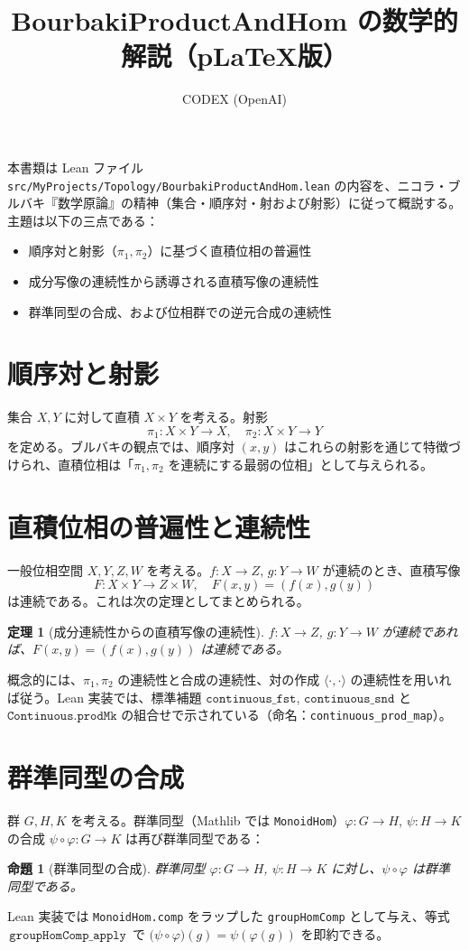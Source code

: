 \documentclass[a4paper,11pt]{jsarticle}
\title{BourbakiProductAndHom の数学的解説（p\LaTeX 版）}
\author{CODEX (OpenAI)}
\date{}
\newtheorem{theorem}{定理}
\newtheorem{proposition}{命題}
\theoremstyle{definition}
\begin{document}
\maketitle

本書類は Lean ファイル \texttt{src/MyProjects/Topology/BourbakiProductAndHom.lean} の内容を、ニコラ・ブルバキ『数学原論』の精神（集合・順序対・射および射影）に従って概説する。主題は以下の三点である：
\begin{itemize}
  \item 順序対と射影（$\pi_1,\pi_2$）に基づく直積位相の普遍性
  \item 成分写像の連続性から誘導される直積写像の連続性
  \item 群準同型の合成、および位相群での逆元合成の連続性
\end{itemize}

\section{順序対と射影}
集合 $X, Y$ に対して直積 $X\times Y$ を考える。射影
\[
  \pi_1 : X\times Y \to X,\quad \pi_2 : X\times Y \to Y
\]
を定める。ブルバキの観点では、順序対 $(x,y)$ はこれらの射影を通じて特徴づけられ、直積位相は「$\pi_1,\pi_2$ を連続にする最弱の位相」として与えられる。

\section{直積位相の普遍性と連続性}
一般位相空間 $X,Y,Z,W$ を考える。$f : X\to Z$, $g : Y\to W$ が連続のとき、直積写像
\[
  F : X\times Y \to Z\times W,\quad F(x,y) = (f(x), g(y))
\]
は連続である。これは次の定理としてまとめられる。

\begin{theorem}[成分連続性からの直積写像の連続性]
\label{thm:prod}
$f : X\to Z$, $g : Y\to W$ が連続であれば、$F(x,y)=(f(x),g(y))$ は連続である。
\end{theorem}

\noindent 概念的には、$\pi_1,\pi_2$ の連続性と合成の連続性、対の作成 $\langle\cdot,\cdot\rangle$ の連続性を用いれば従う。Lean 実装では、標準補題 $\texttt{continuous\_fst}$, $\texttt{continuous\_snd}$ と $\texttt{Continuous.prodMk}$ の組合せで示されている（命名：\texttt{continuous\_prod\_map}）。

\section{群準同型の合成}
群 $G,H,K$ を考える。群準同型（Mathlib では \texttt{MonoidHom}）$\varphi : G\to H$, $\psi : H\to K$ の合成 $\psi\circ\varphi : G\to K$ は再び群準同型である：
\begin{proposition}[群準同型の合成]
\label{prop:gh-comp}
群準同型 $\varphi : G\to H$, $\psi : H\to K$ に対し、$\psi\circ\varphi$ は群準同型である。
\end{proposition}
\noindent Lean 実装では \texttt{MonoidHom.comp} をラップした \texttt{groupHomComp} として与え、等式 \(\,\texttt{groupHomComp\_apply}\,\) で $\bigl(\psi\circ\varphi\bigr)(g)=\psi(\varphi(g))$ を即約できる。
\end{document}

